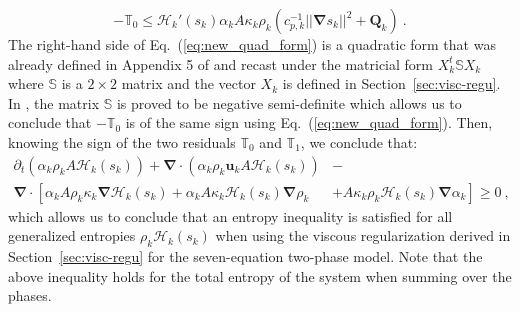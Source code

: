 \documentclass[preprint,10pt]{elsarticle}
\renewcommand{\div}{\mbold{\nabla}\! \cdot \!}
\newcommand{\grad}{\mbold{\nabla}}
\newcommand{\mbold}[1]{\boldsymbol#1}
\newcommand{\eqt}[1]{Eq.~(\ref{#1})}                     %
\newcommand{\sct}[1]{Section~\ref{#1}}                   %
\begin{document}
\begin{appendices}
%
\begin{equation}\label{eq:new_quad_form}
- \mathbb{T}_0 \leq \mathscr{H}_k'(s_k) \alpha_k A \kappa_k \rho_k \left( c_{p,k}^{-1} ||\grad s_k||^2 +  \mathbf{Q}_k\right) \ .
\end{equation}
%
The right-hand side of \eqt{eq:new_quad_form} is a quadratic form that was already defined in Appendix 5 of \cite{jlg} and recast under the matricial form $X^t_k \mathbb{S} X_k$ where $\mathbb{S}$ is a $2 \times 2$ matrix and the vector $X_k$ is defined in \sct{sec:visc-regu}. In \cite{jlg}, the matrix $\mathbb{S}$ is proved to be negative semi-definite which allows us to conclude that $-\mathbb{T}_0$ is of the same sign using \eqt{eq:new_quad_form}. Then, knowing the sign of the two residuals $\mathbb{T}_0$ and $\mathbb{T}_1$, we conclude that:
%
\begin{align}\label{eq:ent-res-7-eqn-diss-terms-app4}
\partial_t \left( \alpha_k \rho_k A \mathscr{H}_k(s_k)\right) + \div \left( \alpha_k \rho_k \mbold u_k A \mathscr{H}_k(s_k) \right)  &- \nonumber\\
\div \left[ \alpha_k A \rho_k \kappa_k \grad \mathscr{H}_k (s_k) + \alpha_k A \kappa_k \mathscr{H}_k (s_k) \grad \rho_k  \right. & \left. + A \kappa_k \rho_k \mathscr{H}_k (s_k) \grad \alpha_k\right] \geq 0 \ ,\nonumber 
\end{align}
%
which allows us to conclude that an entropy inequality is satisfied for all generalized entropies $\rho_k \mathscr{H}_k (s_k)$ when using the viscous regularization derived in \sct{sec:visc-regu} for the seven-equation two-phase model. Note that the above inequality holds for the total entropy of the system when summing over the phases.
\end{appendices}
\end{document}
